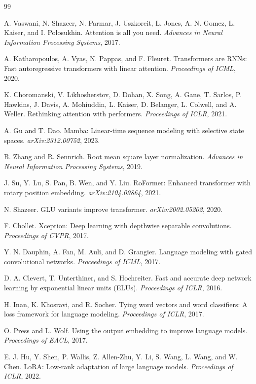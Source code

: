 \documentclass[10pt]{article}
\begin{document}
\begin{thebibliography}{99}

A. Vaswani, N. Shazeer, N. Parmar, J. Uszkoreit, L. Jones, A. N. Gomez, L. Kaiser, and I. Polosukhin.
Attention is all you need.
\emph{Advances in Neural Information Processing Systems}, 2017.

A. Katharopoulos, A. Vyas, N. Pappas, and F. Fleuret.
Transformers are RNNs: Fast autoregressive transformers with linear attention.
\emph{Proceedings of ICML}, 2020.

K. Choromanski, V. Likhosherstov, D. Dohan, X. Song, A. Gane, T. Sarlos, P. Hawkins, J. Davis, A. Mohiuddin, L. Kaiser, D. Belanger, L. Colwell, and A. Weller.
Rethinking attention with performers.
\emph{Proceedings of ICLR}, 2021.

A. Gu and T. Dao.
Mamba: Linear-time sequence modeling with selective state spaces.
\emph{arXiv:2312.00752}, 2023.

B. Zhang and R. Sennrich.
Root mean square layer normalization.
\emph{Advances in Neural Information Processing Systems}, 2019.

J. Su, Y. Lu, S. Pan, B. Wen, and Y. Liu.
RoFormer: Enhanced transformer with rotary position embedding.
\emph{arXiv:2104.09864}, 2021.

N. Shazeer.
GLU variants improve transformer.
\emph{arXiv:2002.05202}, 2020.

F. Chollet.
Xception: Deep learning with depthwise separable convolutions.
\emph{Proceedings of CVPR}, 2017.

Y. N. Dauphin, A. Fan, M. Auli, and D. Grangier.
Language modeling with gated convolutional networks.
\emph{Proceedings of ICML}, 2017.

D. A. Clevert, T. Unterthiner, and S. Hochreiter.
Fast and accurate deep network learning by exponential linear units (ELUs).
\emph{Proceedings of ICLR}, 2016.

H. Inan, K. Khosravi, and R. Socher.
Tying word vectors and word classifiers: A loss framework for language modeling.
\emph{Proceedings of ICLR}, 2017.

O. Press and L. Wolf.
Using the output embedding to improve language models.
\emph{Proceedings of EACL}, 2017.

E. J. Hu, Y. Shen, P. Wallis, Z. Allen-Zhu, Y. Li, S. Wang, L. Wang, and W. Chen.
LoRA: Low-rank adaptation of large language models.
\emph{Proceedings of ICLR}, 2022.

\end{thebibliography}
\end{document}
